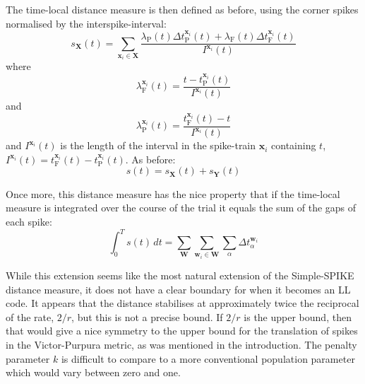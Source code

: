 The time-local distance measure is then defined as before, using the corner spikes normalised by the interspike-interval:
\begin{equation}
s_{\mathbf{X}}(t) = \sum_{\mathbf{x}_i \in \mathbf{X}} \frac{\lambda_{\mathrm{P}}(t)\Delta t_{\mathrm{P}}^{\mathbf{x}_i} (t) + \lambda_{\mathrm{F}}(t)\Delta t_{\mathrm{F}}^{\mathbf{x}_i}(t) }{I^{\mathbf{x}_i}(t) }%
\end{equation}
where 
\begin{equation}
\lambda_{\mathrm{F}}^{\mathbf{x}_i}(t) =\frac{ t-t_{\mathrm{P}}^{\mathbf{x}_i}(t)}{I^{\mathbf{x}_i}(t)}%
\end{equation}
and
\begin{equation}
 \lambda_{\mathrm{P}}^{\mathbf{x}_i}(t) =\frac{ t_{\mathrm{F}}^{\mathbf{x}_i}(t) - t}{I^{\mathbf{x}_i}(t)}%
\end{equation}
and $I^{\mathbf{x}_i}(t)$ is the length of the interval in the spike-train $\mathbf{x}_i$ containing $t$, $I^{\mathbf{x}_i}(t) = t_{\mathrm{F}}^{\mathbf{x}_i}(t) - t_{\mathrm{P}}^{\mathbf{x}_i}(t)$.
 As before:
\begin{equation}
s(t) = s_{\mathbf{X}}(t) + s_{\mathbf{Y}}(t)
\end{equation}

Once more, this distance measure has the nice property that if the time-local measure is integrated over the course of the trial it equals the sum of the gaps of each spike:
\begin{equation}
\int_0^T s(t)\,dt = \sum_{\mathbf{W}} \sum_{\mathbf{w}_i \in \mathbf{W}} \sum_{\alpha} \Delta t_{\alpha}^{\mathbf{w}_i}
\end{equation}

While this extension seems like the most natural extension of the Simple-SPIKE distance measure, it does not have a clear boundary for when it becomes an LL code.  It appears that the distance stabilises at approximately twice the reciprocal of the rate, $2/r$, but this is not a precise bound.  If $2/r$ is the upper bound, then that would give a nice symmetry to the upper bound for the translation of spikes in the Victor-Purpura metric, as was mentioned in the introduction. The penalty parameter $k$ is difficult to compare to a more conventional population parameter which would vary between zero and one.

